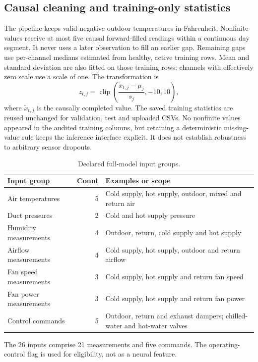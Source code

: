 \subsection{Causal cleaning and training-only statistics}
The pipeline keeps valid negative outdoor temperatures in Fahrenheit. Nonfinite values receive at most five causal forward-filled readings within a continuous day segment. It never uses a later observation to fill an earlier gap. Remaining gaps use per-channel medians estimated from healthy, active training rows. Mean and standard deviation are also fitted on those training rows; channels with effectively zero scale use a scale of one. The transformation is
\begin{equation}
z_{t,j}=\operatorname{clip}\!\left(\frac{\widetilde{x}_{t,j}-\mu_j}{s_j},-10,10\right),
\end{equation}
where $\widetilde{x}_{t,j}$ is the causally completed value. The saved training statistics are reused unchanged for validation, test and uploaded CSVs. No nonfinite values appeared in the audited training columns, but retaining a deterministic missing-value rule keeps the inference interface explicit. It does not establish robustness to arbitrary sensor dropouts.

\begin{table}[htbp]\centering\small
\caption{Declared full-model input groups.}\label{tab:inputs}
\begin{tabularx}{\linewidth}{X r X}
\toprule
Input group & Count & Examples or scope \\
\midrule
Air temperatures & 5 & Cold supply, hot supply, outdoor, mixed and return air \\
Duct pressures & 2 & Cold and hot supply pressure \\
Humidity measurements & 4 & Outdoor, return, cold supply and hot supply \\
Airflow measurements & 4 & Cold supply, hot supply, outdoor and return airflow \\
Fan speed measurements & 3 & Cold supply, hot supply and return fan speed \\
Fan power measurements & 3 & Cold supply, hot supply and return fan power \\
Control commands & 5 & Outdoor, return and exhaust dampers; chilled-water and hot-water valves \\
\bottomrule\end{tabularx}
\par\smallskip\footnotesize The 26 inputs comprise 21 measurements and five commands. The operating-control flag is used for eligibility, not as a neural feature.
\end{table}

